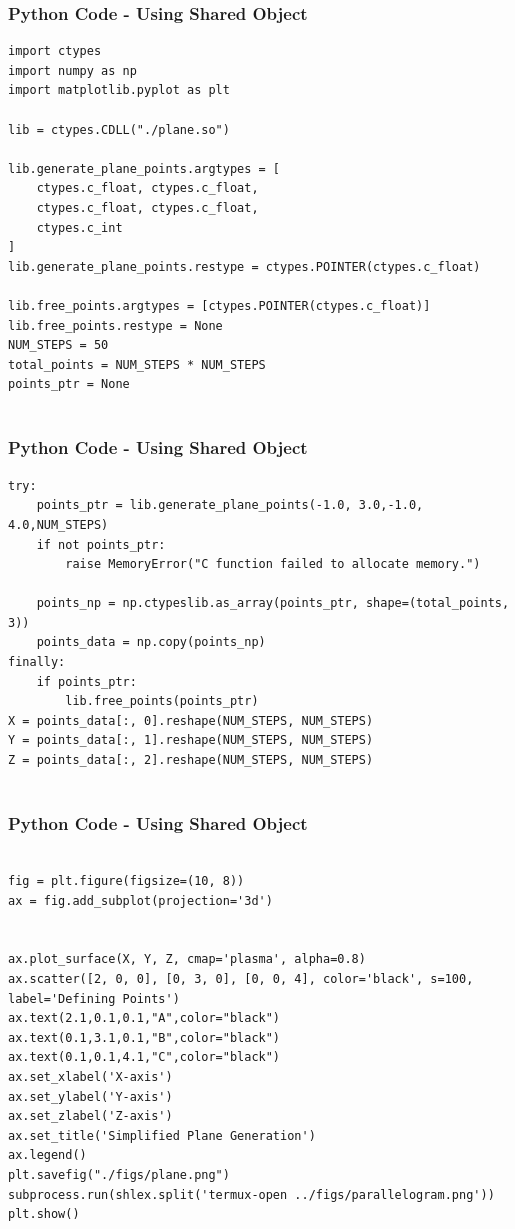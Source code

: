 \documentclass{beamer}
\begin{document}
\begin{frame}[fragile]
    \frametitle{Python Code - Using Shared Object}
    \begin{lstlisting}
import ctypes
import numpy as np
import matplotlib.pyplot as plt

lib = ctypes.CDLL("./plane.so")

lib.generate_plane_points.argtypes = [
    ctypes.c_float, ctypes.c_float,
    ctypes.c_float, ctypes.c_float,
    ctypes.c_int
]
lib.generate_plane_points.restype = ctypes.POINTER(ctypes.c_float)

lib.free_points.argtypes = [ctypes.POINTER(ctypes.c_float)]
lib.free_points.restype = None
NUM_STEPS = 50  
total_points = NUM_STEPS * NUM_STEPS
points_ptr = None


\end{lstlisting}
\end{frame}

\begin{frame}[fragile]
    \frametitle{Python Code - Using Shared Object}
    \begin{lstlisting}
try: 
    points_ptr = lib.generate_plane_points(-1.0, 3.0,-1.0, 4.0,NUM_STEPS)
    if not points_ptr:
        raise MemoryError("C function failed to allocate memory.")
   
    points_np = np.ctypeslib.as_array(points_ptr, shape=(total_points, 3))
    points_data = np.copy(points_np)
finally:
    if points_ptr:
        lib.free_points(points_ptr)
X = points_data[:, 0].reshape(NUM_STEPS, NUM_STEPS)
Y = points_data[:, 1].reshape(NUM_STEPS, NUM_STEPS)
Z = points_data[:, 2].reshape(NUM_STEPS, NUM_STEPS)


\end{lstlisting}
\end{frame}
\begin{frame}[fragile]
    \frametitle{Python Code - Using Shared Object}
    \begin{lstlisting}

fig = plt.figure(figsize=(10, 8))
ax = fig.add_subplot(projection='3d')


ax.plot_surface(X, Y, Z, cmap='plasma', alpha=0.8)
ax.scatter([2, 0, 0], [0, 3, 0], [0, 0, 4], color='black', s=100, label='Defining Points')
ax.text(2.1,0.1,0.1,"A",color="black")
ax.text(0.1,3.1,0.1,"B",color="black")
ax.text(0.1,0.1,4.1,"C",color="black")
ax.set_xlabel('X-axis')
ax.set_ylabel('Y-axis')
ax.set_zlabel('Z-axis')
ax.set_title('Simplified Plane Generation')
ax.legend()
plt.savefig("./figs/plane.png")
subprocess.run(shlex.split('termux-open ../figs/parallelogram.png'))
plt.show()

\end{lstlisting}
\end{frame}
\end{document}
